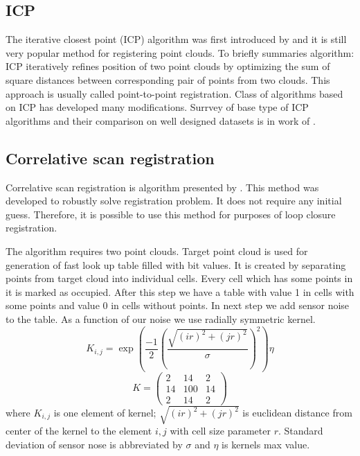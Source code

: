 \subsection {ICP}
\label{subsec:ICP}
The iterative closest point (\gls{ICP}) algorithm was first introduced by \cite{chen92ICP} and it is still very popular method for registering point clouds. To briefly summaries algorithm: ICP iteratively refines position of two point clouds by optimizing the sum of square distances between corresponding pair of points from two clouds. This approach is usually called point-to-point registration. Class of algorithms based on \gls{ICP} has developed many modifications. Surrvey of base type of ICP algorithms and their comparison on well designed datasets is in work of \cite{pomerleau2013comparing}. 


\newpage
\subsection{Correlative scan registration}
\label{subsec:Corr}
Correlative scan registration is algorithm presented by \cite{olson2009real}. This method was developed to robustly solve registration problem. It does not require any initial guess. Therefore, it is possible to use this method for purposes of loop closure registration.

 The algorithm requires two point clouds. Target point cloud is used for generation of fast look up table filled with bit values. It is created by separating points from target cloud into individual cells. Every cell which has some points in it is marked as occupied. After this step we have a table with value 1 in cells with some points and value 0 in cells without points. In next step we add sensor noise to the table. As a function of our noise we use radially symmetric kernel. 
 \begin{equation}
 K_{i,j} = \exp\left(\frac{-1}{2}\left(\frac{\sqrt{(i r)^{2} + (j r)^{2}}}{\sigma}\right)^{2}\right) \eta
 \end{equation}
 \begin{equation}
 K =
 \begin{pmatrix}
  2 & 14 & 2\\
  14 & 100 & 14 \\
  2 & 14 & 2 
 \end{pmatrix}
 \end{equation}
 where $K_{i,j}$ is one element of kernel; $\sqrt{(i r)^{2} + (j r)^{2}}$ is euclidean distance from center of the kernel to the element $i,j$ with cell size parameter $r$. Standard deviation of sensor nose is abbreviated by $\sigma$ and $\eta$ is kernels max value.

